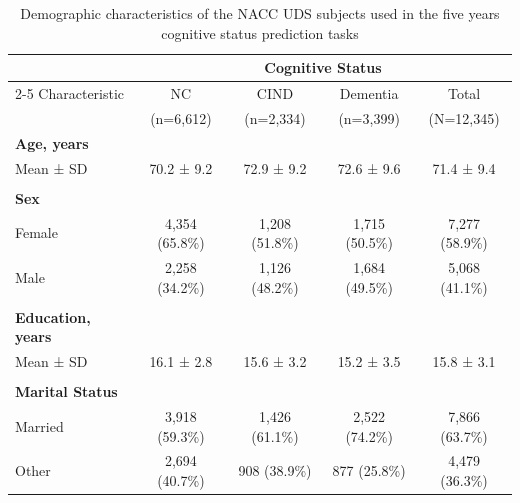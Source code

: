 \begin{table}[htbp]
\centering
\caption{Demographic characteristics of the NACC UDS subjects used in the five years cognitive status prediction tasks}
\label{table:ci-prediction-demographics}
\footnotesize
\begin{tabular}{lcccc}
\toprule
 & \multicolumn{4}{c}{Cognitive Status} \\
\cmidrule{2-5}
Characteristic & NC & CIND & Dementia & Total \\
 & (n=6,612) & (n=2,334) & (n=3,399) & (N=12,345) \\
\midrule
\textbf{Age, years} \\
\quad Mean ± SD & 70.2 ± 9.2 & 72.9 ± 9.2 & 72.6 ± 9.6 & 71.4 ± 9.4 \\
\\
\textbf{Sex} \\
\quad Female & 4,354 (65.8\%) & 1,208 (51.8\%) & 1,715 (50.5\%) & 7,277 (58.9\%) \\
\quad Male & 2,258 (34.2\%) & 1,126 (48.2\%) & 1,684 (49.5\%) & 5,068 (41.1\%) \\
\\
\textbf{Education, years} \\
\quad Mean ± SD & 16.1 ± 2.8 & 15.6 ± 3.2 & 15.2 ± 3.5 & 15.8 ± 3.1 \\
\\
\textbf{Marital Status} \\
\quad Married & 3,918 (59.3\%) & 1,426 (61.1\%) & 2,522 (74.2\%) & 7,866 (63.7\%) \\
\quad Other & 2,694 (40.7\%) & 908 (38.9\%) & 877 (25.8\%) & 4,479 (36.3\%) \\
\bottomrule
\end{tabular}
\end{table}

